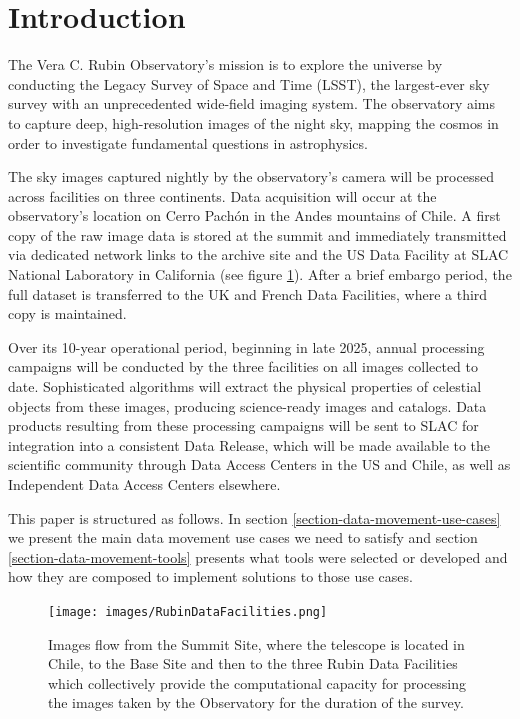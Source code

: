 \documentclass{webofc}
\begin{document}
\maketitle

\section{Introduction}
\label{introduction}
The Vera C. Rubin Observatory's mission is to explore the universe by conducting the Legacy Survey of Space and Time (LSST), the largest-ever sky survey with an unprecedented wide-field imaging system. The observatory aims to capture deep, high-resolution images of the night sky, mapping the cosmos in order to investigate fundamental questions in astrophysics\cite{Ivezic:2019}.

The sky images captured nightly by the observatory's camera will be processed across facilities on three continents. Data acquisition will occur at the observatory's location on Cerro Pachón in the Andes mountains of Chile. A first copy of the raw image data is stored at the summit and immediately transmitted via dedicated network links to the archive site and the US Data Facility at SLAC National Laboratory in California (see figure \ref{fig:data-facilities}). After a brief embargo period, the full dataset is transferred to the UK and French Data Facilities, where a third copy is maintained.

Over its 10-year operational period, beginning in late 2025, annual processing campaigns will be conducted by the three facilities on all images collected to date. Sophisticated algorithms will extract the physical properties of celestial objects from these images, producing science-ready images and catalogs. Data products resulting from these processing campaigns will be sent to SLAC for integration into a consistent Data Release, which will be made available to the scientific community through Data Access Centers in the US and Chile, as well as Independent Data Access Centers elsewhere.

This paper is structured as follows. In section \ref{section-data-movement-use-cases} we present the main data movement use cases we need to satisfy and section \ref{section-data-movement-tools} presents what tools were selected or developed and how they are composed to implement solutions to those use cases.

\begin{figure}[h]
\texttt{[image: images/RubinDataFacilities.png]}
\caption{Images flow from the Summit Site, where the telescope is located in Chile, to the Base Site and then to the three Rubin Data Facilities which collectively provide the computational capacity for processing the images taken by the Observatory for the duration of the survey.}
\label{fig:data-facilities}
\end{figure}
\end{document}
